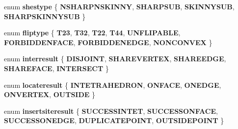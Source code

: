 \begin{DoxyCompactItemize}
\mbox{\label{classStemMesh3D_1_1tetgenmesh_aafead8788dd843fd3fde0bb5af3e19c5}} 
enum {\bfseries shestype} \{ {\bfseries N\+S\+H\+A\+R\+P\+N\+S\+K\+I\+N\+NY}, 
{\bfseries S\+H\+A\+R\+P\+S\+UB}, 
{\bfseries S\+K\+I\+N\+N\+Y\+S\+UB}, 
{\bfseries S\+H\+A\+R\+P\+S\+K\+I\+N\+N\+Y\+S\+UB}
 \}
\item 
\mbox{\label{classStemMesh3D_1_1tetgenmesh_a145df1bb5469ef9750bbd4ffc4baf65b}} 
enum {\bfseries fliptype} \{ \newline
{\bfseries T23}, 
{\bfseries T32}, 
{\bfseries T22}, 
{\bfseries T44}, 
\newline
{\bfseries U\+N\+F\+L\+I\+P\+A\+B\+LE}, 
{\bfseries F\+O\+R\+B\+I\+D\+D\+E\+N\+F\+A\+CE}, 
{\bfseries F\+O\+R\+B\+I\+D\+D\+E\+N\+E\+D\+GE}, 
{\bfseries N\+O\+N\+C\+O\+N\+V\+EX}
 \}
\item 
\mbox{\label{classStemMesh3D_1_1tetgenmesh_a932fad29c9c281acfcd84f5e9b985408}} 
enum {\bfseries interresult} \{ \newline
{\bfseries D\+I\+S\+J\+O\+I\+NT}, 
{\bfseries S\+H\+A\+R\+E\+V\+E\+R\+T\+EX}, 
{\bfseries S\+H\+A\+R\+E\+E\+D\+GE}, 
{\bfseries S\+H\+A\+R\+E\+F\+A\+CE}, 
\newline
{\bfseries I\+N\+T\+E\+R\+S\+E\+CT}
 \}
\item 
\mbox{\label{classStemMesh3D_1_1tetgenmesh_a20ef79c6bd4980b3c1771dfc2c86899a}} 
enum {\bfseries locateresult} \{ \newline
{\bfseries I\+N\+T\+E\+T\+R\+A\+H\+E\+D\+R\+ON}, 
{\bfseries O\+N\+F\+A\+CE}, 
{\bfseries O\+N\+E\+D\+GE}, 
{\bfseries O\+N\+V\+E\+R\+T\+EX}, 
\newline
{\bfseries O\+U\+T\+S\+I\+DE}
 \}
\item 
\mbox{\label{classStemMesh3D_1_1tetgenmesh_a573b108b3b86818997fda0af829d1471}} 
enum {\bfseries insertsiteresult} \{ \newline
{\bfseries S\+U\+C\+C\+E\+S\+S\+I\+N\+T\+ET}, 
{\bfseries S\+U\+C\+C\+E\+S\+S\+O\+N\+F\+A\+CE}, 
{\bfseries S\+U\+C\+C\+E\+S\+S\+O\+N\+E\+D\+GE}, 
{\bfseries D\+U\+P\+L\+I\+C\+A\+T\+E\+P\+O\+I\+NT}, 
\newline
{\bfseries O\+U\+T\+S\+I\+D\+E\+P\+O\+I\+NT}
 \}
\item 

\end{DoxyCompactItemize}
